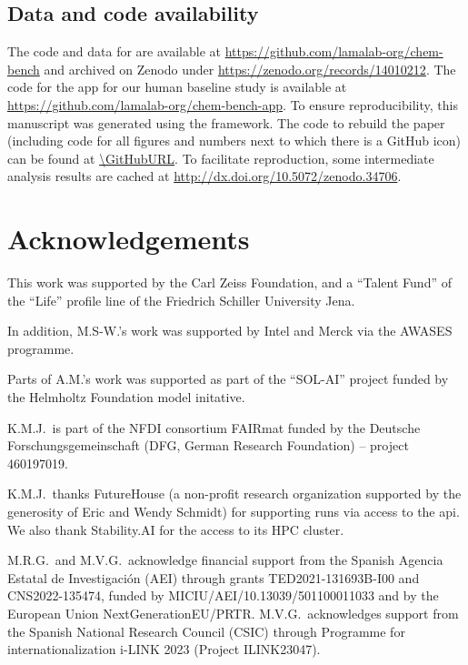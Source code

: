 \documentclass[11pt, oneside]{article}
\begin{document}
\begin{refsegment}
\section*{Data and code availability}
The code and data for \chembench are available at \url{https://github.com/lamalab-org/chem-bench} and archived on Zenodo under \href{10.5281/zenodo.14010212}{https://zenodo.org/records/14010212}.
The code for the app for our human baseline study is available at \url{https://github.com/lamalab-org/chem-bench-app}.
To ensure reproducibility, this manuscript was generated using the \href{https://show-your.work/en/latest/}{\showyourwork} framework.\autocite{Luger2021}
The code to rebuild the paper (including code for all figures and numbers next to which there is a GitHub icon) can be found at \url{\GitHubURL}.
To facilitate reproduction, some intermediate analysis results are cached at \url{http://dx.doi.org/10.5072/zenodo.34706}.

\end{refsegment}
\printbibliography

\section*{Acknowledgements}
This work was supported by the Carl Zeiss Foundation, and a \enquote{Talent Fund} of the \enquote{Life} profile line of the Friedrich Schiller University Jena.

In addition, M.S-W.'s work was supported by Intel and Merck via the AWASES programme.

Parts of A.M.'s work was supported as part of the \enquote{SOL-AI} project funded by the Helmholtz Foundation model initative.

K.M.J.\ is part of the NFDI consortium FAIRmat funded by the Deutsche Forschungsgemeinschaft (DFG, German Research Foundation) – project 460197019.

K.M.J.\ thanks FutureHouse (a non-profit research organization supported by the generosity of Eric and Wendy Schmidt) for supporting \PaperQATwo runs via access to the \gls{api}. We also thank Stability.AI for the access to its HPC cluster.

M.R.G.\ and M.V.G.\ acknowledge financial support from the Spanish Agencia Estatal de Investigaci\'{o}n (AEI) through grants TED2021-131693B-I00 and CNS2022-135474, funded by MICIU/AEI/10.13039/501100011033 and by the European Union NextGenerationEU/PRTR. M.V.G.\ acknowledges support from the Spanish National Research Council (CSIC) through Programme for internationalization i-LINK 2023 (Project ILINK23047).
\end{document}
